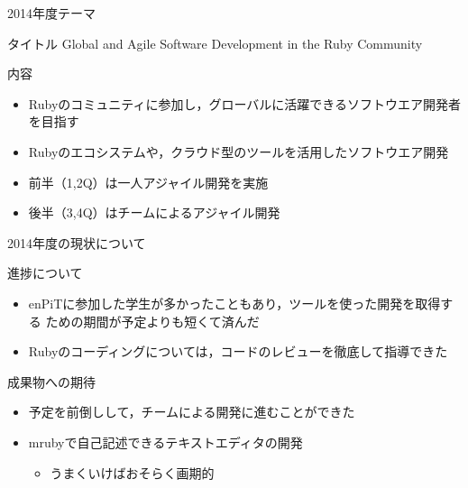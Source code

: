 \documentclass[t]{beamer}
\begin{document}
\begin{frame}[label=sec-7]{2014年度テーマ}
\begin{block}{タイトル}
Global and Agile Software Development in the Ruby Community
\end{block}
\begin{block}{内容}
\begin{itemize}
\item Rubyのコミュニティに参加し，グローバルに活躍できるソフトウエア開発者
を目指す
\item Rubyのエコシステムや，クラウド型のツールを活用したソフトウエア開発
\item 前半（1,2Q）は一人アジャイル開発を実施
\item 後半（3,4Q）はチームによるアジャイル開発
\end{itemize}
\end{block}
\end{frame}

\begin{frame}[label=sec-8]{2014年度の現状について}
\begin{block}{進捗について}
\begin{itemize}
\item enPiTに参加した学生が多かったこともあり，ツールを使った開発を取得する
ための期間が予定よりも短くて済んだ
\item Rubyのコーディングについては，コードのレビューを徹底して指導できた
\end{itemize}
\end{block}
\begin{block}{成果物への期待}
\begin{itemize}
\item 予定を前倒しして，チームによる開発に進むことができた
\item mrubyで自己記述できるテキストエディタの開発
\begin{itemize}
\item うまくいけばおそらく画期的
\end{itemize}
\end{itemize}
\end{block}
\end{frame}
\end{document}
